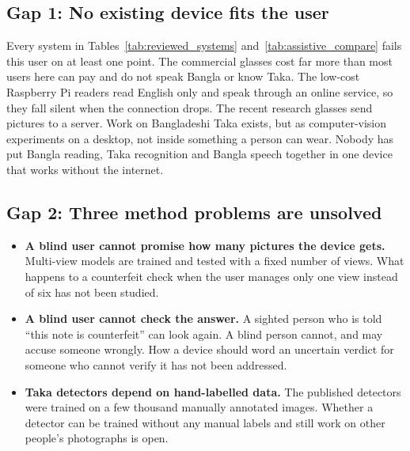 \subsection*{Gap 1: No existing device fits the user}
Every system in Tables~\ref{tab:reviewed_systems} and~\ref{tab:assistive_compare} fails this user on at least one point. The commercial glasses cost far more than most users here can pay and do not speak Bangla or know Taka. The low-cost Raspberry Pi readers read English only and speak through an online service, so they fall silent when the connection drops. The recent research glasses send pictures to a server. Work on Bangladeshi Taka exists, but as computer-vision experiments on a desktop, not inside something a person can wear. Nobody has put Bangla reading, Taka recognition and Bangla speech together in one device that works without the internet.

\subsection*{Gap 2: Three method problems are unsolved}
\begin{itemize}[noitemsep]
    \item \textbf{A blind user cannot promise how many pictures the device gets.} Multi-view models are trained and tested with a fixed number of views. What happens to a counterfeit check when the user manages only one view instead of six has not been studied.
    \item \textbf{A blind user cannot check the answer.} A sighted person who is told ``this note is counterfeit'' can look again. A blind person cannot, and may accuse someone wrongly. How a device should word an uncertain verdict for someone who cannot verify it has not been addressed.
    \item \textbf{Taka detectors depend on hand-labelled data.} The published detectors were trained on a few thousand manually annotated images. Whether a detector can be trained without any manual labels and still work on other people's photographs is open.
\end{itemize}

